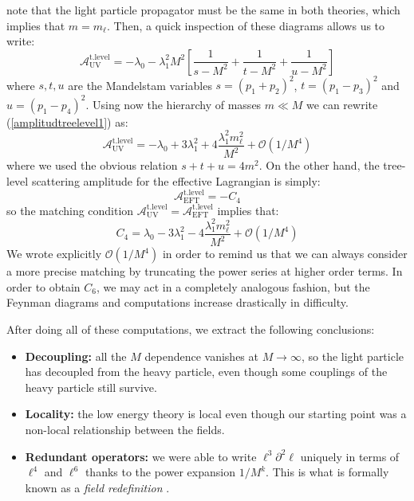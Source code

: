 \documentclass[11pt]{article}
\begin{document}
\noindent note that the light particle propagator must be the same in both theories, which implies that $m=m_\ell$. Then, a quick inspection of these diagrams allows us to write:
\begin{equation}\label{amplitudtreelevel1}
    \mathcal{A}^{\text{t.level}}_\text{UV}=-\lambda_0-\lambda_1^2M^2\left[\dfrac{1}{s-M^2}+\dfrac{1}{t-M^2}+\dfrac{1}{u-M^2}\right]
\end{equation}
where $s,t,u$ are the Mandelstam variables $s =(p_1 + p_2)^2$, $t = (p_1-p_3)^2$ and $u=(p_1-p_4)^2$. Using now the hierarchy of masses $m\ll M$ we can rewrite (\ref{amplitudtreelevel1}) as:
\begin{equation}
     \mathcal{A}^{\text{t.level}}_\text{UV}=-\lambda_0+3\lambda_1^2+4\dfrac{\lambda_1^2m_\ell^2}{M^2}+\mathcal{O}(1/M^4)
\end{equation}
where we used the obvious relation $s+t+u = 4m^2$. On the other hand, the tree-level scattering amplitude for the effective Lagrangian is simply:
\begin{equation}
    \mathcal{A}^{\text{t.level}}_\text{EFT}=-C_4
\end{equation}
so the matching condition $\mathcal{A}^{\text{t.level}}_\text{UV}=\mathcal{A}^{\text{t.level}}_\text{EFT}$ implies that:
\begin{equation}
    C_4=\lambda_0-3\lambda_1^2-4\dfrac{\lambda_1^2m_\ell^2}{M^2}+\mathcal{O}(1/M^4)
\end{equation}
We wrote explicitly $\mathcal{O}(1/M^4)$ in order to remind us that we can always consider a more precise matching by truncating the power series at higher order terms. In order to obtain $C_6$, we may act in a completely analogous fashion, but the Feynman diagrams and computations increase drastically in difficulty. 

After doing all of these computations, we extract the following conclusions:
\begin{itemize}
    \item \textbf{Decoupling:} all the $M$ dependence vanishes at $M\to \infty$, so the light particle has decoupled from the heavy particle, even though some couplings of the heavy particle still survive.
    \item \textbf{Locality:} the low energy theory is local even though our starting point was a non-local relationship between the fields.
    \item \textbf{Redundant operators:} we were able to write $\ell^3\partial^2 \ell$ uniquely in terms of $\ell^4$ and $\ell^6$ thanks to the power expansion $1/M^k$. This is what is formally known as a \textit{field redefinition} \cite{Burgess_2007}.
\end{itemize}
\end{document}
